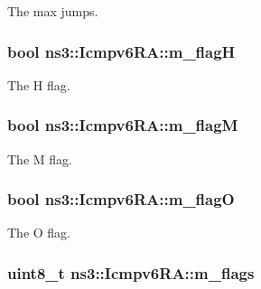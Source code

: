 The max jumps. 

\subsubsection[{\texorpdfstring{m\+\_\+flagH}{m_flagH}}]{\setlength{\rightskip}{0pt plus 5cm}bool ns3\+::\+Icmpv6\+R\+A\+::m\+\_\+flagH\hspace{0.3cm}{\ttfamily [private]}}\hypertarget{classns3_1_1Icmpv6RA_ae67d2ed36a1b6ee63827af46687fc6fb}{}\label{classns3_1_1Icmpv6RA_ae67d2ed36a1b6ee63827af46687fc6fb}


The H flag. 

\subsubsection[{\texorpdfstring{m\+\_\+flagM}{m_flagM}}]{\setlength{\rightskip}{0pt plus 5cm}bool ns3\+::\+Icmpv6\+R\+A\+::m\+\_\+flagM\hspace{0.3cm}{\ttfamily [private]}}\hypertarget{classns3_1_1Icmpv6RA_a162a725afd280e438c8c87ff5991aafd}{}\label{classns3_1_1Icmpv6RA_a162a725afd280e438c8c87ff5991aafd}


The M flag. 

\subsubsection[{\texorpdfstring{m\+\_\+flagO}{m_flagO}}]{\setlength{\rightskip}{0pt plus 5cm}bool ns3\+::\+Icmpv6\+R\+A\+::m\+\_\+flagO\hspace{0.3cm}{\ttfamily [private]}}\hypertarget{classns3_1_1Icmpv6RA_a2fe5497dfcc81cdb2a1cbe7e81c7c9b1}{}\label{classns3_1_1Icmpv6RA_a2fe5497dfcc81cdb2a1cbe7e81c7c9b1}


The O flag. 

\subsubsection[{\texorpdfstring{m\+\_\+flags}{m_flags}}]{\setlength{\rightskip}{0pt plus 5cm}uint8\+\_\+t ns3\+::\+Icmpv6\+R\+A\+::m\+\_\+flags\hspace{0.3cm}{\ttfamily [private]}}\hypertarget{classns3_1_1Icmpv6RA_abe497e092c32d91921f4e446a0920080}{}\label{classns3_1_1Icmpv6RA_abe497e092c32d91921f4e446a0920080}


